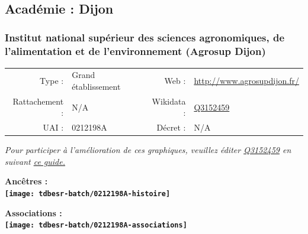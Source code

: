 \documentclass[12pt,french,]{article}
\begin{document}
\ifoddpage \fi ~\newpage  

\hypertarget{acaduxe9mie-dijon-1}{%
\subsection{Académie : Dijon}\label{acaduxe9mie-dijon-1}}

\hypertarget{institut-national-supuxe9rieur-des-sciences-agronomiques-de-lalimentation-et-de-lenvironnement-agrosup-dijon}{%
\subsubsection{Institut national supérieur des sciences agronomiques, de
l'alimentation et de l'environnement (Agrosup
Dijon)}\label{institut-national-supuxe9rieur-des-sciences-agronomiques-de-lalimentation-et-de-lenvironnement-agrosup-dijon}}

\begin{tabular*}{\textwidth}{rp{5cm}rl}  
\hline  
Type : & Grand établissement & Web : &\href{http://www.agrosupdijon.fr/}{http://www.agrosupdijon.fr/} \\  
Rattachement : & N/A & Wikidata : & \href{https://www.wikidata.org/entity/Q3152459}{Q3152459} \\  
UAI : & 0212198A & Décret : & N/A \\  
\hline  
\end{tabular*}

\textit{\scriptsize Pour participer à l'amélioration de ces graphiques, veuillez éditer  \href{https://www.wikidata.org/entity/Q3152459}{Q3152459}  en suivant \href{https://github.com/cpesr/wikidataESR/blob/master/Rmd/wikidataESR.md}{ce guide.}}

\vspace{1cm}  
\begin{minipage}[b]{0.50\textwidth}\begin{center} \bf Ancêtres : \\  
\texttt{[image: tdbesr-batch/0212198A-histoire]} \end{center}\end{minipage}\begin{minipage}[b]{0.50\textwidth}\begin{center} \bf Associations : \\  
\texttt{[image: tdbesr-batch/0212198A-associations]} \end{center}\end{minipage}

\hrulefill
\end{document}
